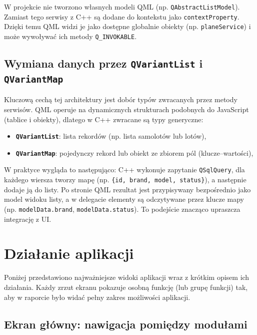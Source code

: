 \documentclass[fleqn,onecolumn,a4paper,12pt,titlepage]{article}
\begin{document}
W projekcie nie tworzono własnych modeli QML (np. \texttt{QAbstractListModel}). Zamiast tego serwisy z C++ są dodane do kontekstu jako \texttt{contextProperty}. Dzięki temu QML widzi je jako dostępne globalnie obiekty (np. \texttt{planeService}) i może wywoływać ich metody \texttt{Q\_INVOKABLE}.



\subsection*{Wymiana danych przez \texttt{QVariantList} i \texttt{QVariantMap}}

Kluczową cechą tej architektury jest dobór typów zwracanych przez metody serwisów. QML operuje na dynamicznych strukturach podobnych do JavaScript (tablice i obiekty), dlatego w C++ zwracane są typy generyczne:
\begin{itemize}[leftmargin=*]
    \item \textbf{\texttt{QVariantList}}: lista rekordów (np. lista samolotów lub lotów),
    \item \textbf{\texttt{QVariantMap}}: pojedynczy rekord lub obiekt ze zbiorem pól (klucze--wartości),
\end{itemize}

W praktyce wygląda to następująco: C++ wykonuje zapytanie \texttt{QSqlQuery}, dla każdego wiersza tworzy mapę (np. \texttt{\{id, brand, model, status\}}), a następnie dodaje ją do listy. Po stronie QML rezultat jest przypisywany bezpośrednio jako model widoku listy, a w delegacie elementy są odczytywane przez klucze mapy (np. \texttt{modelData.brand}, \texttt{modelData.status}). To podejście znacząco upraszcza integrację z UI.


\newpage

\section{Działanie aplikacji}

Poniżej przedstawiono najważniejsze widoki aplikacji wraz z krótkim opisem ich działania. Każdy zrzut ekranu pokazuje osobną funkcję (lub grupę funkcji) tak, aby w raporcie było widać pełny zakres możliwości aplikacji.
\subsection{Ekran główny: nawigacja pomiędzy modułami}
\end{document}
